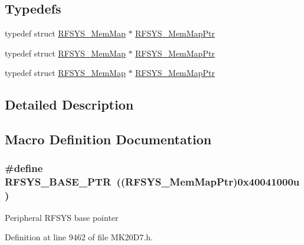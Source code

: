 \subsection*{Typedefs}
\begin{DoxyCompactItemize}
\item 
typedef struct \hyperlink{struct_r_f_s_y_s___mem_map}{R\+F\+S\+Y\+S\+\_\+\+Mem\+Map} $\ast$ \hyperlink{group___r_f_s_y_s___peripheral_gaea9e2f6aeeb4976615e3c3dd87acff9e}{R\+F\+S\+Y\+S\+\_\+\+Mem\+Map\+Ptr}
\item 
typedef struct \hyperlink{struct_r_f_s_y_s___mem_map}{R\+F\+S\+Y\+S\+\_\+\+Mem\+Map} $\ast$ \hyperlink{group___r_f_s_y_s___peripheral_gaea9e2f6aeeb4976615e3c3dd87acff9e}{R\+F\+S\+Y\+S\+\_\+\+Mem\+Map\+Ptr}
\item 
typedef struct \hyperlink{struct_r_f_s_y_s___mem_map}{R\+F\+S\+Y\+S\+\_\+\+Mem\+Map} $\ast$ \hyperlink{group___r_f_s_y_s___peripheral_gaea9e2f6aeeb4976615e3c3dd87acff9e}{R\+F\+S\+Y\+S\+\_\+\+Mem\+Map\+Ptr}
\end{DoxyCompactItemize}


\subsection{Detailed Description}


\subsection{Macro Definition Documentation}
\subsubsection[{\texorpdfstring{R\+F\+S\+Y\+S\+\_\+\+B\+A\+S\+E\+\_\+\+P\+TR}{RFSYS_BASE_PTR}}]{\setlength{\rightskip}{0pt plus 5cm}\#define R\+F\+S\+Y\+S\+\_\+\+B\+A\+S\+E\+\_\+\+P\+TR~(({\bf R\+F\+S\+Y\+S\+\_\+\+Mem\+Map\+Ptr})0x40041000u)}\hypertarget{group___r_f_s_y_s___peripheral_ga2dab66eae1abcaf22879dbce661ea2fa}{}\label{group___r_f_s_y_s___peripheral_ga2dab66eae1abcaf22879dbce661ea2fa}
Peripheral R\+F\+S\+YS base pointer 

Definition at line 9462 of file M\+K20\+D7.\+h.

